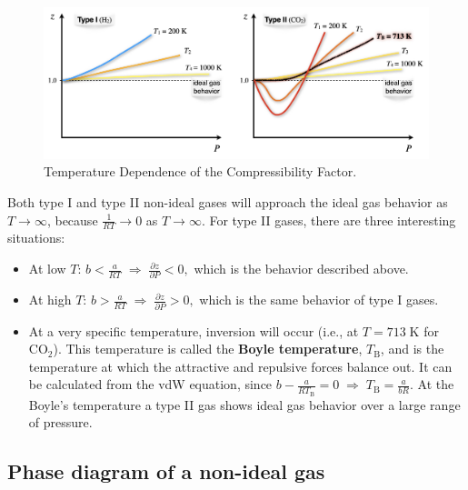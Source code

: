 \documentclass[
  9pt,
]{extbook}
\providecommand{\tightlist}{%
  \setlength{\itemsep}{0pt}\setlength{\parskip}{0pt}}
\theoremstyle{definition}
\theoremstyle{definition}
\theoremstyle{definition}
\theoremstyle{definition}
\theoremstyle{remark}
\begin{document}
\begin{figure}

{\centering \includegraphics[width=0.9\linewidth]{./img/OEP_Figures.013} 

}

\caption{Temperature Dependence of the Compressibility Factor.}\label{fig:Fig1Zb2}
\end{figure}

Both type I and type II non-ideal gases will approach the ideal gas behavior as \(T\rightarrow \infty\), because \(\frac{1}{RT}\rightarrow 0\) as \(T\rightarrow \infty\). For type II gases, there are three interesting situations:

\begin{itemize}
\tightlist
\item
  At low \(T\): \(b<\frac{a}{RT} \; \Rightarrow \; \frac{\partial z}{\partial P} < 0,\) which is the behavior described above.
\item
  At high \(T\): \(b>\frac{a}{RT} \; \Rightarrow \; \frac{\partial z}{\partial P} > 0,\) which is the same behavior of type I gases.
\item
  At a very specific temperature, inversion will occur (i.e., at \(T=713 \; \mathrm{K}\) for \(\mathrm{CO}_2\)). This temperature is called the \textbf{Boyle temperature}, \(T_{\mathrm{B}}\), and is the temperature at which the attractive and repulsive forces balance out. It can be calculated from the vdW equation, since \(b-\frac{a}{RT_{\mathrm{B}}}=0 \; \Rightarrow \; T_{\mathrm{B}}=\frac{a}{bR}.\) At the Boyle's temperature a type II gas shows ideal gas behavior over a large range of pressure.
\end{itemize}

\subsection{Phase diagram of a non-ideal gas}\label{phase-diagram-of-a-non-ideal-gas}
\end{document}
